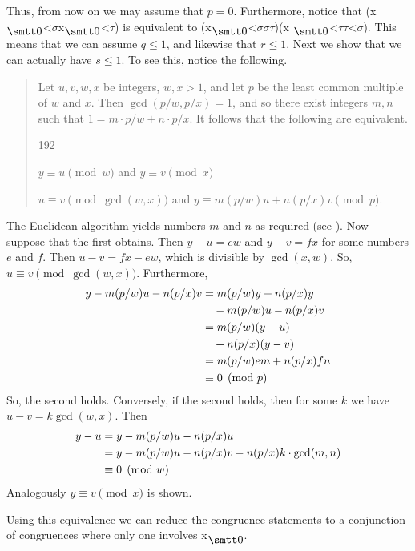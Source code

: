 Thus, from now on we may assume that $p = 0$. Furthermore, notice that 
{\mtt (x$_{\snull}$<$\sigma$x$_{\snull}$<$\tau$)} is equivalent to
{\mtt (x$_{\snull}$<$\sigma$$\sigma$$\tau$)(x%
$_{\snull}$<$\tau$$\tau$<$\sigma$)}. This means that we can assume 
$q \leq 1$, and likewise that $r \leq 1$. Next we show that we can 
actually have $s \leq 1$. To see this, notice the following. 
\begin{quote}
Let $u,v,w,x$ be integers, $w, x > 1$, and let $p$ be the least 
common multiple of $w$ and $x$. Then $\gcd(p/w, p/x) = 1$, 
and so there exist integers $m, n$ such that  $1 = m \cdot p/w + 
n \cdot p/x$. It follows that the following are equivalent. 
\begin{dingautolist}{192}
\item $y \equiv u \pmod{w}$ and $y \equiv v \pmod{x}$ 
\item $u \equiv v \pmod{\gcd(w,x)}$ and 
	$y \equiv m(p/w)u + n(p/x)v \pmod{p}$. 
\end{dingautolist} 
\end{quote}
The Euclidean algorithm yields numbers $m$ and $n$ as required 
(see \cite{jones:numbertheory}). Now suppose that the first obtains.  
Then $y - u = ew$ and $y - v = fx$ for some numbers $e$ and $f$. 
Then $u - v = fx - ew$, which is divisible by $\gcd(x,w)$. 
So, $u \equiv v \pmod{\gcd(w,x)}$. Furthermore, 
\begin{align}
y - m(p/w)u - n(p/x)v & = m(p/w)y + n(p/x)y \\\notag
		& \quad - m(p/w)u - n(p/x)v \\\notag
		& = m(p/w)(y - u) \\\notag
		& \quad + n(p/x)(y - v) \\\notag
		& = m(p/w)em + n(p/x)fn  \\\notag
		& \equiv 0 \pmod{p} 
\end{align}
So, the second holds. Conversely, if the second holds, then for 
some $k$ we have $u - v = k \gcd(w,x)$. Then 
\begin{align}
y - u           & = y - m(p/w)u - n(p/x)u \\\notag
		& = y - m(p/w)u - n(p/x)v - 
		n(p/x)k \cdot \gcd(m,n)\\\notag
		& \equiv 0 \pmod{w} 
\end{align}
Analogously $y \equiv v \pmod{x}$ is shown. 
		  
Using this equivalence we can reduce the congruence statements to 
a conjunction of congruences where only one involves {\mtt x$_{\snull}$}. 

